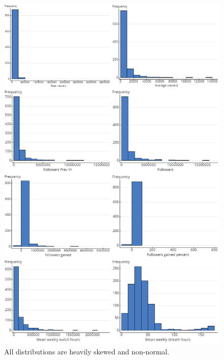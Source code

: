 \documentclass[12pt]{article}
\begin{document}
\begin{figure}
  \centering
  \includegraphics[width=0.8\linewidth]{../StatCrunch_Results/Histogram_Matrix.png}
  \captionsetup{justification=centering, singlelinecheck=false, margin=2cm}
  \caption[Histogram Matrix]{All distributions are heavily skewed and non-normal.}
  \label{fig:histogram_matrix}
\end{figure}
\end{document}
